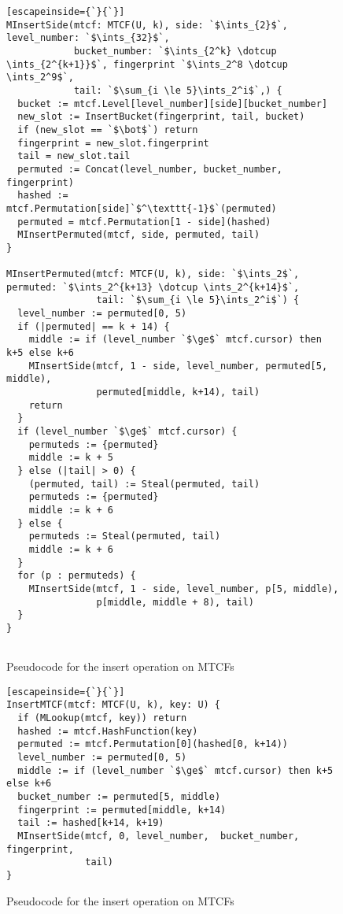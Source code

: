 \documentclass[manuscript,screen,review]{acmart}
\newcommand{\ints}{\mathbb{Z}}
\newcommand{\dotcup}{\ensuremath{\mathaccent\cdot\cup}}
\begin{document}
\begin{figure}

\begin{lstlisting}[escapeinside={`}{`}]
MInsertSide(mtcf: MTCF(U, k), side: `$\ints_{2}$`, level_number: `$\ints_{32}$`,
            bucket_number: `$\ints_{2^k} \dotcup \ints_{2^{k+1}}$`, fingerprint `$\ints_2^8 \dotcup \ints_2^9$`,
            tail: `$\sum_{i \le 5}\ints_2^i$`,) {
  bucket := mtcf.Level[level_number][side][bucket_number]
  new_slot := InsertBucket(fingerprint, tail, bucket)
  if (new_slot == `$\bot$`) return
  fingerprint = new_slot.fingerprint
  tail = new_slot.tail
  permuted := Concat(level_number, bucket_number, fingerprint)
  hashed := mtcf.Permutation[side]`$^\texttt{-1}$`(permuted)
  permuted = mtcf.Permutation[1 - side](hashed)
  MInsertPermuted(mtcf, side, permuted, tail)
}

MInsertPermuted(mtcf: MTCF(U, k), side: `$\ints_2$`, permuted: `$\ints_2^{k+13} \dotcup \ints_2^{k+14}$`,
                tail: `$\sum_{i \le 5}\ints_2^i$`) {
  level_number := permuted[0, 5)
  if (|permuted| == k + 14) {
    middle := if (level_number `$\ge$` mtcf.cursor) then k+5 else k+6
    MInsertSide(mtcf, 1 - side, level_number, permuted[5, middle),
                permuted[middle, k+14), tail)
    return
  }
  if (level_number `$\ge$` mtcf.cursor) {
    permuteds := {permuted}
    middle := k + 5
  } else (|tail| > 0) {
    (permuted, tail) := Steal(permuted, tail)
    permuteds := {permuted}
    middle := k + 6
  } else {
    permuteds := Steal(permuted, tail)
    middle := k + 6
  }
  for (p : permuteds) {
    MInsertSide(mtcf, 1 - side, level_number, p[5, middle),
                p[middle, middle + 8), tail)
  }
}


\end{lstlisting}
\caption{Pseudocode for the insert operation on MTCFs}

\end{figure}


\begin{figure}

\begin{lstlisting}[escapeinside={`}{`}]
InsertMTCF(mtcf: MTCF(U, k), key: U) {
  if (MLookup(mtcf, key)) return
  hashed := mtcf.HashFunction(key)
  permuted := mtcf.Permutation[0](hashed[0, k+14))
  level_number := permuted[0, 5)
  middle := if (level_number `$\ge$` mtcf.cursor) then k+5 else k+6
  bucket_number := permuted[5, middle)
  fingerprint := permuted[middle, k+14)
  tail := hashed[k+14, k+19)
  MInsertSide(mtcf, 0, level_number,  bucket_number, fingerprint,
              tail)
}
\end{lstlisting}
\caption{Pseudocode for the insert operation on MTCFs}

\end{figure}
\end{document}
